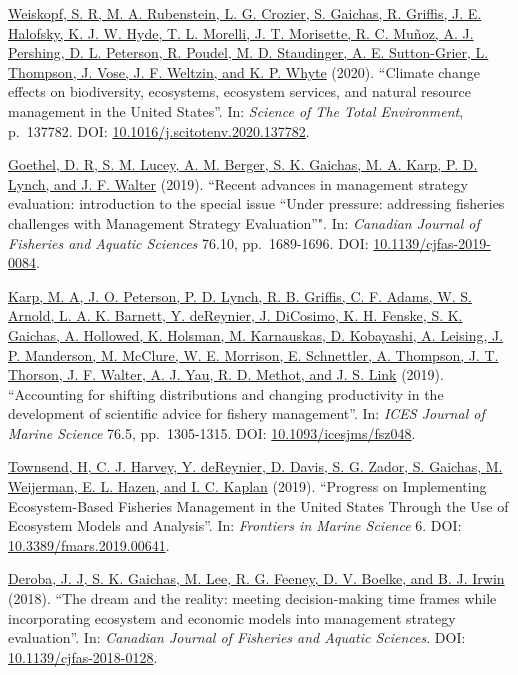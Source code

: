 \documentclass[11pt, a4paper]{awesome-cv}
\begin{document}
\protect\hyperlink{cite-weiskopf_climate_2020}{Weiskopf, S. R, M. A.
Rubenstein, L. G. Crozier, S. Gaichas, R. Griffis, J. E. Halofsky, K.
J. W. Hyde, T. L. Morelli, J. T. Morisette, R. C. Muñoz, A. J.
Pershing, D. L. Peterson, R. Poudel, M. D. Staudinger, A. E.
Sutton-Grier, L. Thompson, J. Vose, J. F. Weltzin, and K. P.
Whyte} (2020). ``Climate change effects on
biodiversity, ecosystems, ecosystem services, and natural resource
management in the United States''. In: \emph{Science of The Total
Environment}, p.~137782. DOI:
\href{https://doi.org/10.1016\%2Fj.scitotenv.2020.137782}{10.1016/j.scitotenv.2020.137782}.

\protect\hyperlink{cite-goethel_recent_2019}{Goethel, D. R, S. M. Lucey, A. M.
Berger, S. K. Gaichas, M. A. Karp, P. D. Lynch, and J. F.
Walter} (2019). ``Recent advances in
management strategy evaluation: introduction to the special issue
``Under pressure: addressing fisheries challenges with Management
Strategy Evaluation''". In: \emph{Canadian Journal of Fisheries and Aquatic
Sciences} 76.10, pp.~1689-1696. DOI:
\href{https://doi.org/10.1139\%2Fcjfas-2019-0084}{10.1139/cjfas-2019-0084}.

\protect\hyperlink{cite-karp_accounting_2019}{Karp, M. A, J. O. Peterson, P. D.
Lynch, R. B. Griffis, C. F. Adams, W. S. Arnold, L. A. K. Barnett, Y.
deReynier, J. DiCosimo, K. H. Fenske, S. K. Gaichas, A. Hollowed, K.
Holsman, M. Karnauskas, D. Kobayashi, A. Leising, J. P. Manderson, M.
McClure, W. E. Morrison, E. Schnettler, A. Thompson, J. T. Thorson, J.
F. Walter, A. J. Yau, R. D. Methot, and J. S.
Link} (2019). ``Accounting for shifting
distributions and changing productivity in the development of
scientific advice for fishery management''. In: \emph{ICES Journal of Marine
Science} 76.5, pp.~1305-1315. DOI:
\href{https://doi.org/10.1093\%2Ficesjms\%2Ffsz048}{10.1093/icesjms/fsz048}.

\protect\hyperlink{cite-townsend_progress_2019}{Townsend, H, C. J. Harvey, Y.
deReynier, D. Davis, S. G. Zador, S. Gaichas, M. Weijerman, E. L.
Hazen, and I. C. Kaplan} (2019).
``Progress on Implementing Ecosystem-Based Fisheries Management in the
United States Through the Use of Ecosystem Models and Analysis''. In:
\emph{Frontiers in Marine Science} 6. DOI:
\href{https://doi.org/10.3389\%2Ffmars.2019.00641}{10.3389/fmars.2019.00641}.

\protect\hyperlink{cite-deroba_dream_2018}{Deroba, J. J, S. K. Gaichas, M. Lee,
R. G. Feeney, D. V. Boelke, and B. J. Irwin}
(2018). ``The dream and the reality: meeting decision-making time frames
while incorporating ecosystem and economic models into management
strategy evaluation''. In: \emph{Canadian Journal of Fisheries and Aquatic
Sciences}. DOI:
\href{https://doi.org/10.1139\%2Fcjfas-2018-0128}{10.1139/cjfas-2018-0128}.
\end{document}
